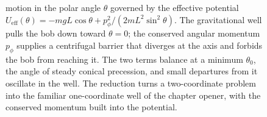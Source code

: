 \begin{figure}[htbp]
{motion in the polar angle $\theta$ governed by the effective potential
$U_\mathrm{eff}(\theta) = -mgL\cos\theta + p_\phi^2/(2mL^2\sin^2\theta)$. The
gravitational well pulls the bob down toward $\theta=0$; the conserved angular
momentum $p_\phi$ supplies a centrifugal barrier that diverges at the axis and
forbids the bob from reaching it. The two terms balance at a minimum $\theta_0$,
the angle of steady conical precession, and small departures from it oscillate
in the well. The reduction turns a two-coordinate problem into the familiar
one-coordinate well of the chapter opener, with the conserved momentum built
into the potential.}
\label{fig:vol03ch05:effective-potential}
\end{figure}

